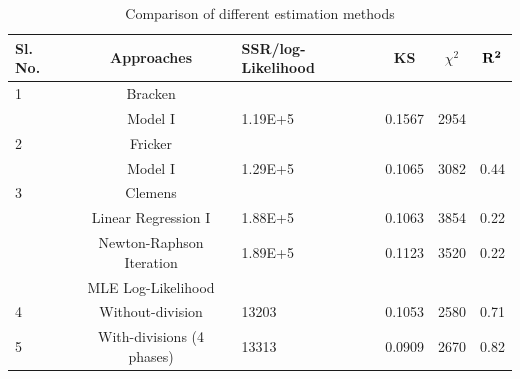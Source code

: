 \documentclass[]{article}
\begin{document}
\begin{table}
\centering
\tiny
\caption{Comparison of different estimation methods}

{\begin{tabular}{|p{.1cm}|c|p{.8cm}|c|c|c|}   \hline\hline
\bf{Sl. No.} & \bf{Approaches} &	\bf{SSR/log-Likelihood}	& \bf{KS} & \bf{$\chi^2$} & $\bf{R^2}$  \\
\hline
\hline
1&Bracken\autocite{Bracken:1995}& & & &  \\
\hline
&Model I&1.19E+5&0.1567&2954&\\
\hline
2&Fricker\autocite{Fricker:1998}& & & &  \\
\hline
&Model I&1.29E+5&0.1065&3082&0.44\\
\hline
3&Clemens\autocite{Clemens:1997}& & & &  \\
\hline
&Linear Regression I&1.88E+5&0.1063&3854&0.22\\
\hline
&Newton-Raphson Iteration&1.89E+5&0.1123&3520&0.22\\
\hline
&MLE Log-Likelihood \autocite{Das:2007}& & & &  \\
\hline
4&Without-division&13203&0.1053&2580&0.71\\
\hline
5&With-divisions (4 phases)&13313&0.0909&2670&0.82\\
\hline
\hline
\end{tabular}}
\end{table}
\end{document}
